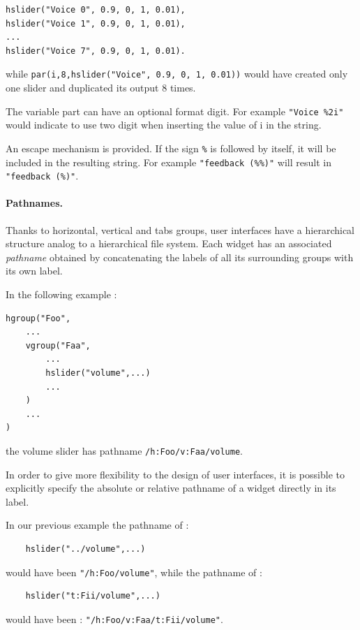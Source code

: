 \documentclass[a4paper,10pt]{book}
\begin{document}
\begin{lstlisting}
hslider("Voice 0", 0.9, 0, 1, 0.01),
hslider("Voice 1", 0.9, 0, 1, 0.01),
...
hslider("Voice 7", 0.9, 0, 1, 0.01).
\end{lstlisting}

while \lstinline'par(i,8,hslider("Voice", 0.9, 0, 1, 0.01))' would have created only one slider and duplicated its output 8 times.


The variable part can have an optional format digit. 
For example \lstinline'"Voice %2i"' would indicate to use two digit when inserting the value of i in the string.

An escape mechanism is provided.
If the sign \lstinline'%' is followed by itself, it will be included in the resulting string.
For example \lstinline'"feedback (%%)"' will result in \lstinline'"feedback (%)"'.

\paragraph{Pathnames.}
Thanks to horizontal, vertical and tabs groups, user interfaces have a hierarchical structure analog to a hierarchical file system. Each widget has an associated \textit{pathname} obtained by concatenating the labels of all its surrounding groups with its own label.

In the following example :
\begin{lstlisting}
hgroup("Foo",
	...
	vgroup("Faa", 
		...
		hslider("volume",...)
		...
	)
	...
)
\end{lstlisting}
the volume slider has pathname \lstinline'/h:Foo/v:Faa/volume'.

In order to give more flexibility to the design of user interfaces, it is possible to explicitly specify the absolute or relative pathname of a widget directly in its label. 

In our previous example the pathname of :
\begin{lstlisting}
	hslider("../volume",...)
\end{lstlisting}
would have been \lstinline'"/h:Foo/volume"', while the pathname of :
\begin{lstlisting}
	hslider("t:Fii/volume",...)
\end{lstlisting}
would have been : 
\lstinline'"/h:Foo/v:Faa/t:Fii/volume"'.
\end{document}
